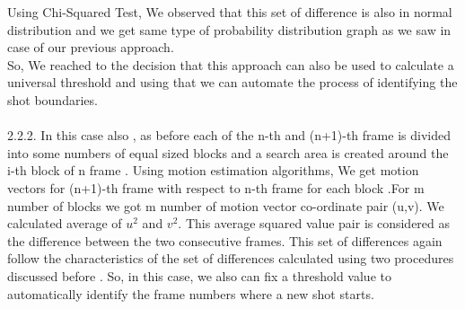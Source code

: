 \documentclass[twocolumn,twoside]{article}
\begin{document}
Using Chi-Squared Test, We observed that this set of difference is also in normal distribution and we get same type of probability distribution graph as we saw in case of our previous approach.\\
So, We reached to the decision that this approach can also be used to calculate a universal threshold and using that we can automate the process of identifying the shot boundaries.\\ \\
2.2.2. In this case also , as before each of the n-th and (n+1)-th frame is divided into some numbers of equal sized blocks and a search area is created around the i-th block of n frame . Using motion estimation algorithms, We get motion vectors for (n+1)-th frame with respect to n-th frame for each block .For m number of blocks we got m number of motion vector co-ordinate pair (u,v). We calculated average of $u^2$ and $v^2$. This average squared value pair is considered as the difference between the two consecutive frames. This set of differences again follow the characteristics  of the set of differences calculated using two procedures discussed before . So, in this case, we also can fix a threshold  value to automatically identify the frame numbers where a new shot starts.
\end{document}
